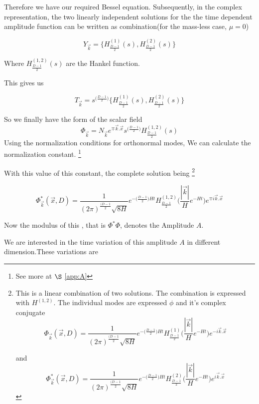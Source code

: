 Therefore we have our required Bessel equation. Subsequently, in the complex representation, the two linearly independent solutions for the the time dependent amplitude function can be written as combination(for the mass-less case, $\mu=0$)

\begin{equation}
Y_{\vec{k}} = \bigg\{ H^{(1)}_{\frac{D-1}{2}}(s), H^{(2)}_{\frac{D-1}{2}}(s)\bigg\}
\end{equation}

Where $H^{(1,2)}_{\frac{D-1}{2}}(s)$ are the Hankel function.

This gives us

\begin{equation}
T_{\vec{k}}= s^{\big(\frac{D-1}{2}\big)}\bigg\{ H^{(1)}_{\frac{D-1}{2}}(s), H^{(2)}_{\frac{D-1}{2}}(s)\bigg\}
\end{equation}

So we finally have the form of the scalar field
\begin{equation}
\Phi_{\vec{k}} = N_{\vec{k}} e^{\mp \vec{k}.\vec{x}}s ^{\big(\frac{D-1}{2}\big)}H^{(1,2)}_{\frac{D-1}{2}}(s)
\end{equation}
Using the normalization conditions for orthonormal modes, We can calculate the normalization constant. \footnote{See more at $\S$ \cref{app:A}} 

With this value of this constant, the complete solution being
\footnote{
This is a linear combination of two solutions. The combination is expressed with $H^{(1,2)}$. The individual modes are expressed $\phi$ and it's complex conjugate
$$\Phi_{\vec{k}}(\vec{x},D) = \frac{1}{(2\pi)^{\frac{(D-1}{2}} \sqrt{8H}}e^{-\big(\frac{D-1}{2}\big)Ht}H^{(1)}_{\frac{D-1}{2}}\bigg(\frac{|\vec{k}|}{H}e^{-Ht}\bigg)e^{-i\vec{k}.\vec{x}}
$$


and
$$\Phi_{\vec{k}}^{*}(\vec{x},D) = \frac{1}{(2\pi)^{\frac{(D-1}{2}} \sqrt{8H}}e^{-\big(\frac{D-1}{2}\big)Ht}H^{(2)}_{\frac{D-1}{2}}\bigg(\frac{|\vec{k}|}{H}e^{-Ht}\bigg)e^{i\vec{k}.\vec{x}}
$$
}

\begin{equation}
\Phi_{\vec{k}}^{*}(\vec{x},D) = \frac{1}{(2\pi)^{\frac{(D-1}{2}} \sqrt{8H}}e^{-\big(\frac{D-1}{2}\big)Ht}H^{(1,2)}_{\frac{D-1}{2}}\bigg(\frac{|\vec{k}|}{H}e^{-Ht}\bigg)e^{\mp i\vec{k}.\vec{x}}
\end{equation}

Now the modulus of this , that is $\Phi^*\Phi$, denotes the Amplitude $A$.

We are interested in the time variation of this amplitude $A$ in different dimension.These variations are